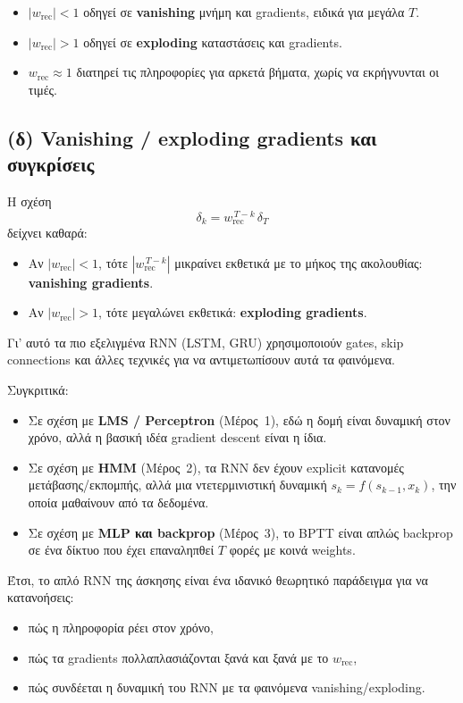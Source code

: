 \documentclass[a4paper,11pt]{article}
\begin{document}
\begin{itemize}
  \item $|w_{\mathrm{rec}}|<1$ οδηγεί σε \textbf{vanishing} μνήμη και gradients,
        ειδικά για μεγάλα $T$.
  \item $|w_{\mathrm{rec}}|>1$ οδηγεί σε \textbf{exploding} καταστάσεις και gradients.
  \item $w_{\mathrm{rec}}\approx 1$ διατηρεί τις πληροφορίες για αρκετά βήματα,
        χωρίς να εκρήγνυνται οι τιμές.
\end{itemize}

\subsection{(δ) Vanishing / exploding gradients και συγκρίσεις}

Η σχέση
\[
\delta_k = w_{\mathrm{rec}}^{\,T-k}\, \delta_T
\]
δείχνει καθαρά:

\begin{itemize}
  \item Αν $|w_{\mathrm{rec}}|<1$, τότε $|w_{\mathrm{rec}}^{\,T-k}|$ μικραίνει
        εκθετικά με το μήκος της ακολουθίας: \textbf{vanishing gradients}.
  \item Αν $|w_{\mathrm{rec}}|>1$, τότε μεγαλώνει εκθετικά:
        \textbf{exploding gradients}.
\end{itemize}

Γι’ αυτό τα πιο εξελιγμένα RNN (LSTM, GRU) χρησιμοποιούν gates,
skip connections και άλλες τεχνικές για να αντιμετωπίσουν αυτά τα φαινόμενα.

Συγκριτικά:

\begin{itemize}
  \item Σε σχέση με \textbf{LMS / Perceptron} (Μέρος~1),
        εδώ η δομή είναι δυναμική στον χρόνο, αλλά η βασική ιδέα
        gradient descent είναι η ίδια.
  \item Σε σχέση με \textbf{HMM} (Μέρος~2),
        τα RNN δεν έχουν explicit κατανομές μετάβασης/εκπομπής,
        αλλά μια ντετερμινιστική δυναμική $s_k=f(s_{k-1},x_k)$,
        την οποία μαθαίνουν από τα δεδομένα.
  \item Σε σχέση με \textbf{MLP και backprop} (Μέρος~3),
        το BPTT είναι απλώς backprop σε ένα δίκτυο που έχει επαναληπθεί
        $T$ φορές με κοινά weights.
\end{itemize}

Έτσι, το απλό RNN της άσκησης είναι ένα ιδανικό θεωρητικό παράδειγμα
για να κατανοήσεις:
\begin{itemize}
  \item πώς η πληροφορία ρέει στον χρόνο,
  \item πώς τα gradients πολλαπλασιάζονται ξανά και ξανά με το $w_{\mathrm{rec}}$,
  \item πώς συνδέεται η δυναμική του RNN με τα φαινόμενα vanishing/exploding.
\end{itemize}
\end{document}
